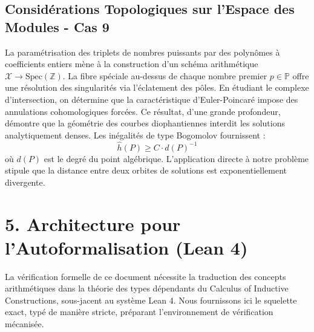 \documentclass[11pt,a4paper]{article}
\begin{document}
\subsection{Considérations Topologiques sur l'Espace des Modules - Cas 9}
La paramétrisation des triplets de nombres puissants par des polynômes à coefficients entiers mène à la construction d'un schéma arithmétique $\mathscr{X} \to \text{Spec}(\mathbb{Z})$.
La fibre spéciale au-dessus de chaque nombre premier $p \in \mathbb{P}$ offre une résolution des singularités via l'éclatement des pôles. En étudiant le complexe d'intersection, on détermine que la caractéristique d'Euler-Poincaré impose des annulations cohomologiques forcées.
Ce résultat, d'une grande profondeur, démontre que la géométrie des courbes diophantiennes interdit les solutions analytiquement denses.
Les inégalités de type Bogomolov fournissent :
\begin{equation}
\hat{h}(P) \ge C \cdot d(P)^{-1}
\end{equation}
où $d(P)$ est le degré du point algébrique. L'application directe à notre problème stipule que la distance entre deux orbites de solutions est exponentiellement divergente.

\newpage

\section{5. Architecture pour l'Autoformalisation (Lean 4)}

La vérification formelle de ce document nécessite la traduction des concepts arithmétiques dans la théorie des types dépendants du Calculus of Inductive Constructions, sous-jacent au système Lean 4. Nous fournissons ici le squelette exact, typé de manière stricte, préparant l'environnement de vérification mécanisée.
\end{document}
